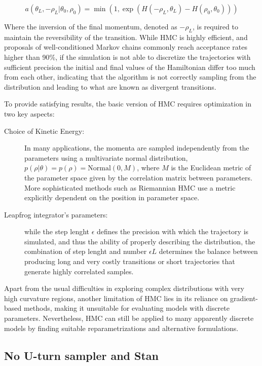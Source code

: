 \begin{equation}
a(\theta_{L},-\rho_{L}|\theta_{0},\rho_{0}) = \min (1, \exp(H(-\rho_L,\theta_L)-H(\rho_0, \theta_0)))
\end{equation}

Where the inversion of the final momentum, denoted as $-\rho_L$, is required to maintain the reversibility of the
transition. While HMC is highly efficient, and proposals of well-conditioned Markov chains commonly reach acceptance rates higher than 90\%, if the simulation is not able to discretize the trajectories with sufficient precision the initial and final values of the Hamiltonian differ too much from each other, indicating that the algorithm is not correctly sampling from the distribution and leading to what are known as divergent transitions. 

To provide satisfying results, the basic version of HMC requires optimization in two key aspects:

\begin{description}
\item[Choice of Kinetic Energy:] In many applications, the momenta are sampled independently from the parameters using a
  multivariate normal distribution, $p(\rho|\theta) = p(\rho) = \text{Normal}(0, M)$, where $M$ is the Euclidean metric
  of the parameter space given by the correlation matrix between parameters. More sophisticated methods such as
  Riemannian HMC use a metric explicitly dependent on the position in parameter space.
\item[Leapfrog integrator's parameters:] while the step lenght $\epsilon$ defines the precision with which the
  trajectory is simulated, and thus the ability of properly describing the distribution, the combination of step lenght and number $\epsilon L$ determines the balance between producing long and very costly transitions or short trajectories that generate highly correlated samples.
\end{description}

Apart from the usual difficulties in exploring complex distributions with very high curvature regions, another limitation of HMC lies in its reliance on gradient-based methods, making it unsuitable for evaluating models with discrete parameters. Nevertheless, HMC can still be applied to many apparently discrete models by finding suitable reparametrizations and alternative formulations.

\subsection{No U-turn sampler and Stan}

